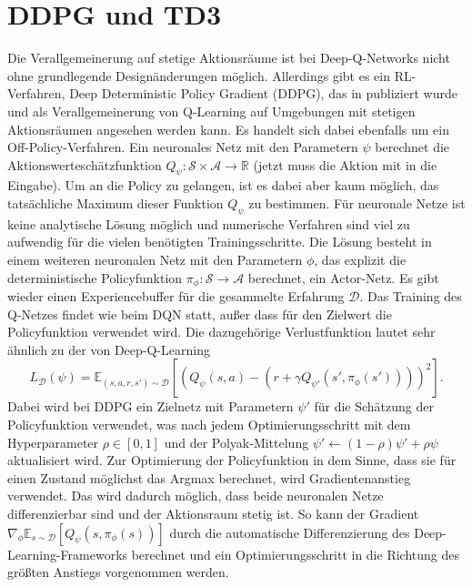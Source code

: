 \section{DDPG und TD3}
Die Verallgemeinerung auf stetige Aktionsräume ist bei Deep-Q-Networks nicht ohne grundlegende Designänderungen möglich.
Allerdings gibt es ein RL-Verfahren, Deep Deterministic Policy Gradient (DDPG), das in \cite{10.5555/3044805.3044850} publiziert wurde und als Verallgemeinerung von Q-Learning auf Umgebungen mit stetigen Aktionsräumen angesehen werden kann.
Es handelt sich dabei ebenfalls um ein Off-Policy-Verfahren.
Ein neuronales Netz mit den Parametern $\psi$ berechnet die Aktionswerteschätzfunktion $Q_\psi: \mathcal{S} \times \mathcal{A}\rightarrow \mathbb{R}$ (jetzt muss die Aktion mit in die Eingabe).
Um an die Policy zu gelangen, ist es dabei aber kaum möglich, das tatsächliche Maximum dieser Funktion $Q_\psi$ zu bestimmen.
Für neuronale Netze ist keine analytische Lösung möglich und numerische Verfahren sind viel zu aufwendig für die vielen benötigten Trainingsschritte.
Die Lösung besteht in einem weiteren neuronalen Netz mit den Parametern $\phi$, das explizit die deterministische Policyfunktion $\pi_\phi: \mathcal{S} \rightarrow \mathcal{A}$ berechnet, ein Actor-Netz.
Es gibt wieder einen Experiencebuffer für die gesammelte Erfahrung $\mathcal{D}$.
Das Training des Q-Netzes findet wie beim DQN statt, außer dass für den Zielwert die Policyfunktion verwendet wird.
Die dazugehörige Verlustfunktion lautet sehr ähnlich zu der von Deep-Q-Learning
\begin{equation}
	L_\mathcal{D}(\psi) = \mathbb{E}_{(s, a, r, s')\sim\mathcal{D}}\left[\left(Q_\psi(s,a)-\left(r+\gamma Q_{\psi'}(s',\pi_\phi(s'))\right)\right)^2\right].
\end{equation}
Dabei wird bei DDPG ein Zielnetz mit Parametern $\psi'$ für die Schätzung der Policyfunktion verwendet, was nach jedem Optimierungsschritt mit dem Hyperparameter $\rho \in [0, 1]$ und der Polyak-Mittelung $\psi' \leftarrow (1 - \rho) \psi' + \rho \psi$ aktualisiert wird.
Zur Optimierung der Policyfunktion in dem Sinne, dass sie für einen Zustand möglichst das Argmax berechnet, wird Gradientenanstieg verwendet.
Das wird dadurch möglich, dass beide neuronalen Netze differenzierbar sind und der Aktionsraum stetig ist.
So kann der Gradient $\nabla_\phi \mathbb{E}_{s\sim\mathcal{D}}\left[Q_\psi(s, \pi_\phi(s))\right]$ durch die automatische Differenzierung des Deep-Learning-Frameworks berechnet und ein Optimierungsschritt in die Richtung des größten Anstiegs vorgenommen werden.


